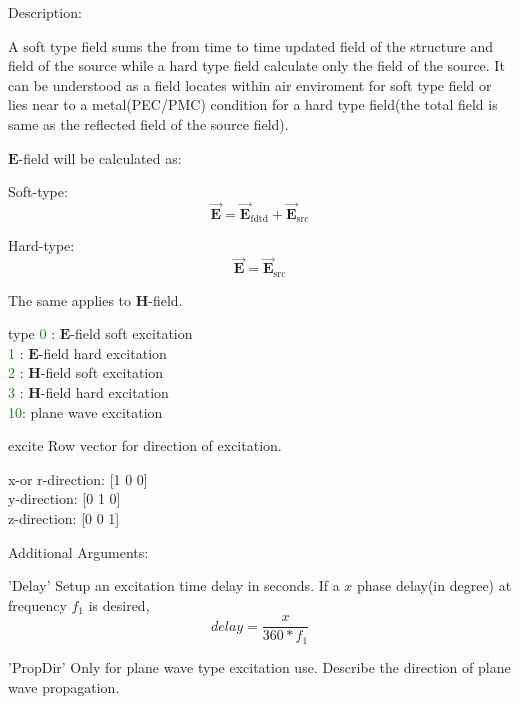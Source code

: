 \begin{FontDescr}{Description:}
 
A soft type field sums the from time to time updated field of the structure and field of the source while a hard type field calculate only the field of the source. It can be understood as a field locates within air enviroment for soft type field or lies near to a metal(PEC/PMC) condition for a hard type field(the total field is same as the reflected field of the source field).  

$\mathbf{E}$-field will be calculated as: 

Soft-type:
\begin{equation}
\vec{\mathbf{E}}=\vec{\mathbf{E}}_{\text{fdtd}}+\vec{\mathbf{E}}_{\text{src}} 
\end{equation}   

Hard-type:
\begin{equation}
\vec{\mathbf{E}}=\vec{\mathbf{E}}_{\text{src}}     
\end{equation}   

The same applies to $\mathbf{H}$-field.

\begin{FontPara}{type}
\textcolor{green}{0} : $\mathbf{E}$-field soft excitation \\
\textcolor{green}{1} : $\mathbf{E}$-field hard excitation\\
\textcolor{green}{2} : $\mathbf{H}$-field soft excitation\\
\textcolor{green}{3} : $\mathbf{H}$-field hard excitation\\
\textcolor{green}{10}: plane wave excitation
\end{FontPara}

\begin{FontPara}{excite}\label{excite_dir}
Row vector for direction of excitation.
\begin{myindentpar}
  x-or r-direction: [1 0 0] \\
  y-direction: [0 1 0] \\
  z-direction: [0 0 1] 
\end{myindentpar}
\end{FontPara}

\end{FontDescr}

\begin{FontDescr}{Additional Arguments:}

\begin{FontPara}{'Delay'} \label{delay}
Setup an excitation time delay in seconds. If a $x$ phase delay(in degree) at frequency $f_{1}$ is desired, 
\begin{equation}
delay= \dfrac{x}{360*f_{1}}
\end{equation}   
\end{FontPara}

\begin{FontPara}{'PropDir'} 
Only for plane wave type excitation use. Describe the direction of plane wave propagation.
\end{FontPara}
\end{FontDescr}

